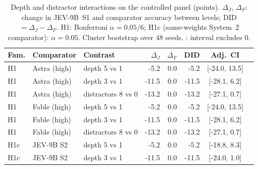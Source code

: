\begin{table}[t]
\centering\small
\caption{Depth and distractor interactions on the controlled panel (points). $\Delta_J$, $\Delta_F$: change in JEV-9B~S1 and comparator accuracy between levels; DID $=\Delta_J-\Delta_F$. H1: Bonferroni $\alpha=0.05/6$; H1c (same-weights System~2 comparator): $\alpha=0.05$. Cluster bootstrap over 48 seeds. \checkmark: interval excludes 0.}
\label{tab:did}
\begin{tabular}{@{}lllrrrcc@{}}
\toprule
Fam. & Comparator & Contrast & $\Delta_J$ & $\Delta_F$ & DID & Adj.\ CI & \\
\midrule
H1 & Astra (high) & depth 5 vs 1 & -5.2 & 0.0 & -5.2 & [-24.0, 13.5] &  \\
H1 & Astra (high) & depth 3 vs 1 & -11.5 & 0.0 & -11.5 & [-28.1, 6.2] &  \\
H1 & Astra (high) & distractors 8 vs 0 & -13.2 & 0.0 & -13.2 & [-27.1, 0.7] &  \\
H1 & Fable (high) & depth 5 vs 1 & -5.2 & 0.0 & -5.2 & [-24.0, 13.5] &  \\
H1 & Fable (high) & depth 3 vs 1 & -11.5 & 0.0 & -11.5 & [-28.1, 6.2] &  \\
H1 & Fable (high) & distractors 8 vs 0 & -13.2 & 0.0 & -13.2 & [-27.1, 0.7] &  \\
H1c & JEV-9B S2 & depth 5 vs 1 & -5.2 & 0.0 & -5.2 & [-18.8, 8.3] &  \\
H1c & JEV-9B S2 & depth 3 vs 1 & -11.5 & 0.0 & -11.5 & [-24.0, 1.0] &  \\
\bottomrule
\end{tabular}
\end{table}
